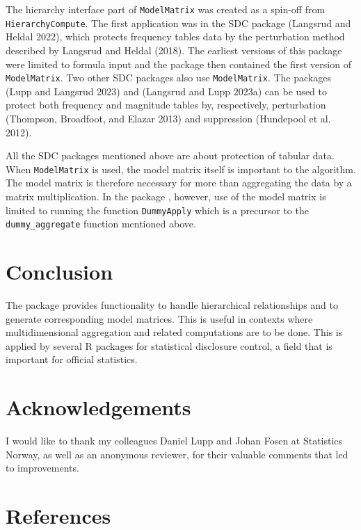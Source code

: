 The hierarchy interface part of \texttt{ModelMatrix} was created as a spin-off from \texttt{HierarchyCompute}.
The first application was in the SDC package  (Langsrud and Heldal 2022),
which protects frequency tables data by the perturbation method described by Langsrud and Heldal (2018).
The earliest versions of this package were limited to formula input and the package then contained the first version of \texttt{ModelMatrix}.
Two other SDC packages also use \texttt{ModelMatrix}.
The packages  (Lupp and Langsrud 2023) and  (Langsrud and Lupp 2023a) can be used to protect both frequency and magnitude tables
by, respectively, perturbation (Thompson, Broadfoot, and Elazar 2013) and suppression (Hundepool et al. 2012).

All the SDC packages mentioned above are about protection of tabular data.
When \texttt{ModelMatrix} is used, the model matrix itself is important to the algorithm.
The model matrix is therefore necessary for more than aggregating the data by a matrix multiplication.
In the package , however, use of the model matrix is limited to running the  function \texttt{DummyApply}
which is a precursor to the \texttt{dummy\_aggregate} function mentioned above.

\hypertarget{conclusion}{%
\section{Conclusion}\label{conclusion}}

The  package provides functionality to handle hierarchical relationships and to generate corresponding model matrices.
This is useful in contexts where multidimensional aggregation and related computations are to be done.
This is applied by several R packages for statistical disclosure control, a field that is important for official statistics.

\hypertarget{acknowledgements}{%
\section*{Acknowledgements}\label{acknowledgements}}

I would like to thank my colleagues Daniel Lupp and Johan Fosen at Statistics Norway, as well as an anonymous reviewer, for their valuable comments that led to improvements.

\hypertarget{references}{%
\section*{References}\label{references}}

